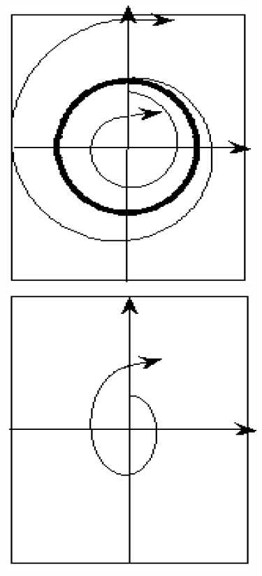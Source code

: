 	\vspace{-1em}
	\begin{figure}[H]
		\centering
		\begin{minipage}{0.247\textwidth}
			\includegraphics[width=\textwidth]{img/10_07}
		\end{minipage}
		\begin{minipage}{0.25\textwidth}
			\includegraphics[width=\textwidth]{img/10_08}

\end{minipage}
\end{figure}
